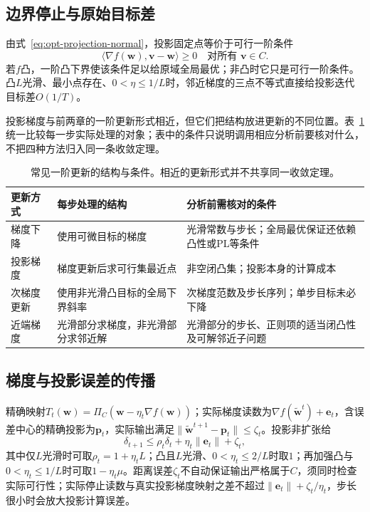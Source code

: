 \subsection{边界停止与原始目标差}

由式~\eqref{eq:opt-projection-normal}，投影固定点等价于可行一阶条件
\[
 \langle\nabla f(\bm w),\bm v-\bm w\rangle\geq0
 \quad\text{对所有 }\bm v\in C.
\]
若$f$凸，一阶凸下界使该条件足以给原域全局最优；非凸时它只是可行一阶条件。凸$L$光滑、最小点存在、$0<\eta\leq1/L$时，邻近梯度的三点不等式直接给投影迭代目标差$O(1/T)$。

投影梯度与前两章的一阶更新形式相近，但它们把结构放进更新的不同位置。表~\ref{tab:opt-first-order-structures}统一比较每一步实际处理的对象；表中的条件只说明调用相应分析前要核对什么，不把四种方法归入同一条收敛定理。

\begin{table}[!htb]
 \centering\small
 \begin{tabularx}{\linewidth}{@{}lXX@{}}
 \toprule
 更新方式 & 每步处理的结构 & 分析前需核对的条件\\
 \midrule
 梯度下降 & 使用可微目标的梯度 & 光滑常数与步长；全局最优保证还依赖凸性或PL等条件\\
 投影梯度 & 梯度更新后求可行集最近点 & 非空闭凸集；投影本身的计算成本\\
 次梯度更新 & 使用非光滑凸目标的全局下界斜率 & 次梯度范数及步长序列；单步目标未必下降\\
 近端梯度 & 光滑部分求梯度，非光滑部分求邻近解 & 光滑部分的步长、正则项的适当闭凸性及可解邻近子问题\\
 \bottomrule
 \end{tabularx}
 \caption{常见一阶更新的结构与条件。相近的更新形式并不共享同一收敛定理。}
 \label{tab:opt-first-order-structures}
\end{table}

\subsection{梯度与投影误差的传播}

精确映射$T_t(\bm w)=\Pi_C(\bm w-\eta_t\nabla f(\bm w))$；实际梯度读数为$\nabla f(\widetilde{\bm w}^t)+\bm e_t$，含误差中心的精确投影为$\bm p_t$，实际输出满足$\|\widetilde{\bm w}^{t+1}-\bm p_t\|\leq\zeta_t$。投影非扩张给
\[
 \delta_{t+1}\leq\rho_t\delta_t+\eta_t\|\bm e_t\|+\zeta_t,
\]
其中仅$L$光滑时可取$\rho_t=1+\eta_t L$；凸且$L$光滑、$0<\eta_t\leq2/L$时取$1$；再加强凸与$0<\eta_t\leq1/L$时可取$1-\eta_t\mu$。距离误差$\zeta_t$不自动保证输出严格属于$C$，须同时检查实际可行性；实际停止读数与真实投影梯度映射之差不超过$\|\bm e_t\|+\zeta_t/\eta_t$，步长很小时会放大投影计算误差。

